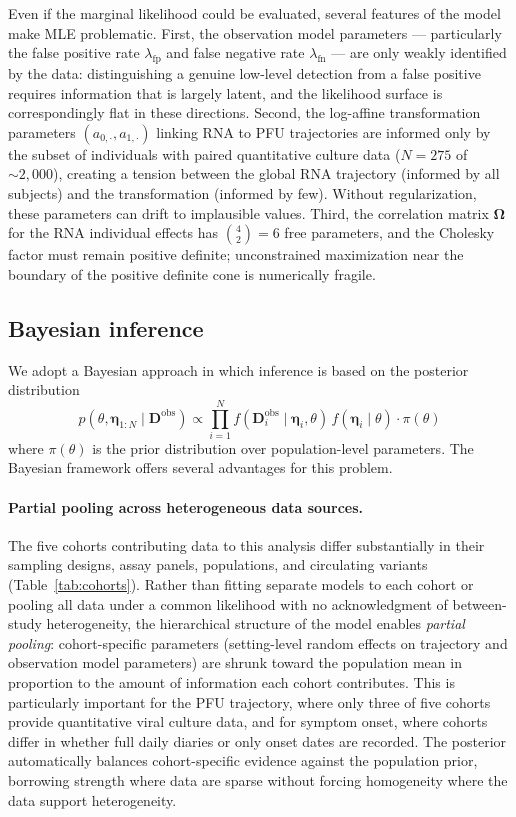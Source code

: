 \documentclass[12pt]{article}
\begin{document}
Even if the marginal likelihood could be evaluated, several features of the model make MLE problematic. First, the observation model parameters --- particularly the false positive rate $\lambda_{\text{fp}}$ and false negative rate $\lambda_{\text{fn}}$ --- are only weakly identified by the data: distinguishing a genuine low-level detection from a false positive requires information that is largely latent, and the likelihood surface is correspondingly flat in these directions. Second, the log-affine transformation parameters $(a_{0,\cdot}, a_{1,\cdot})$ linking RNA to PFU trajectories are informed only by the subset of individuals with paired quantitative culture data ($N = 275$ of ${\sim}2{,}000$), creating a tension between the global RNA trajectory (informed by all subjects) and the transformation (informed by few). Without regularization, these parameters can drift to implausible values. Third, the correlation matrix $\boldsymbol{\Omega}$ for the RNA individual effects has $\binom{4}{2} = 6$ free parameters, and the Cholesky factor must remain positive definite; unconstrained maximization near the boundary of the positive definite cone is numerically fragile.

\subsection{Bayesian inference}

We adopt a Bayesian approach in which inference is based on the posterior distribution
\begin{equation*}
    p(\theta, \boldsymbol{\eta}_{1:N} \mid \mathbf{D}^{\text{obs}}) \propto \prod_{i=1}^{N} f(\mathbf{D}_i^{\text{obs}} \mid \boldsymbol{\eta}_i, \theta)\, f(\boldsymbol{\eta}_i \mid \theta) \cdot \pi(\theta)
\end{equation*}
where $\pi(\theta)$ is the prior distribution over population-level parameters. The Bayesian framework offers several advantages for this problem.

\paragraph{Partial pooling across heterogeneous data sources.} The five cohorts contributing data to this analysis differ substantially in their sampling designs, assay panels, populations, and circulating variants (Table~\ref{tab:cohorts}). Rather than fitting separate models to each cohort or pooling all data under a common likelihood with no acknowledgment of between-study heterogeneity, the hierarchical structure of the model enables \emph{partial pooling}: cohort-specific parameters (setting-level random effects on trajectory and observation model parameters) are shrunk toward the population mean in proportion to the amount of information each cohort contributes. This is particularly important for the PFU trajectory, where only three of five cohorts provide quantitative viral culture data, and for symptom onset, where cohorts differ in whether full daily diaries or only onset dates are recorded. The posterior automatically balances cohort-specific evidence against the population prior, borrowing strength where data are sparse without forcing homogeneity where the data support heterogeneity.
\end{document}
